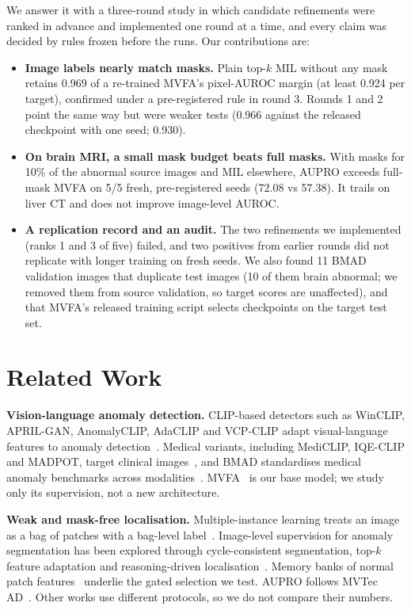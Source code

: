 \documentclass[10pt,twocolumn,letterpaper]{article}
\begin{document}
We answer it with a three-round study in which candidate refinements were ranked in advance and implemented one round at a time, and every claim was decided by rules frozen before the runs. Our contributions are:
\begin{itemize}
\item \textbf{Image labels nearly match masks.} Plain top-$k$ MIL without any mask retains 0.969 of a re-trained MVFA's pixel-AUROC margin (at least 0.924 per target), confirmed under a pre-registered rule in round 3. Rounds 1 and 2 point the same way but were weaker tests (0.966 against the released checkpoint with one seed; 0.930).
\item \textbf{On brain MRI, a small mask budget beats full masks.} With masks for 10\% of the abnormal source images and MIL elsewhere, AUPRO exceeds full-mask MVFA on 5/5 fresh, pre-registered seeds (72.08 vs 57.38). It trails on liver CT and does not improve image-level AUROC.
\item \textbf{A replication record and an audit.} The two refinements we implemented (ranks 1 and 3 of five) failed, and two positives from earlier rounds did not replicate with longer training on fresh seeds. We also found 11 BMAD validation images that duplicate test images (10 of them brain abnormal; we removed them from source validation, so target scores are unaffected), and that MVFA's released training script selects checkpoints on the target test set.
\end{itemize}

\section{Related Work}
\label{sec:related}
\textbf{Vision-language anomaly detection.} CLIP-based detectors such as WinCLIP, APRIL-GAN, AnomalyCLIP, AdaCLIP and VCP-CLIP adapt visual-language features to anomaly detection~\cite{winclip2023,aprilgan2023,anomalyclip2023,adaclip2024,vcpclip2024}. Medical variants, including MediCLIP, IQE-CLIP and MADPOT, target clinical images~\cite{mediclip2024,iqeclip2026,madpot2026}, and BMAD standardises medical anomaly benchmarks across modalities~\cite{bmad2024,medicalad_survey2021}. MVFA~\cite{huang2024mvfa} is our base model; we study only its supervision, not a new architecture.

\textbf{Weak and mask-free localisation.} Multiple-instance learning treats an image as a bag of patches with a bag-level label~\cite{ilse2018attentionmil}. Image-level supervision for anomaly segmentation has been explored through cycle-consistent segmentation, top-$k$ feature adaptation and reasoning-driven localisation~\cite{cycle_seg2021,adfa2023,imagelevel2026}. Memory banks of normal patch features~\cite{patchcore2021} underlie the gated selection we test. AUPRO follows MVTec AD~\cite{mvtec2019}. Other works use different protocols, so we do not compare their numbers.
\end{document}
